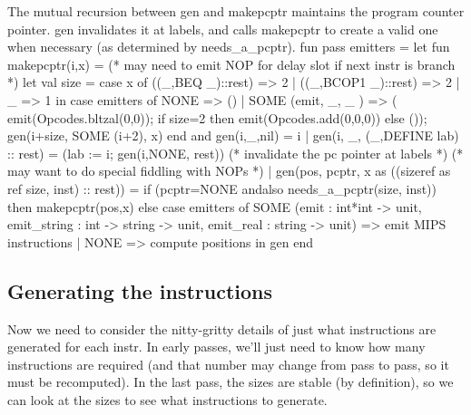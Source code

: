 The mutual recursion between \code{}gen\edoc{} and \code{}makepcptr\edoc{} maintains
the program counter pointer.
\code{}gen\edoc{} invalidates it at labels, and calls \code{}makepcptr\edoc{} to create a valid
one when necessary (as determined by \code{}needs_a_pcptr\edoc{}).
\enddocs
{}
\endmoddef
fun pass emitters =
let fun makepcptr(i,x) = 
         (* may need to emit NOP for delay slot if next instr is branch *)
  let val size = case x of ((_,BEQ _)::rest) => 2 
                         | ((_,BCOP1 _)::rest) => 2 
                         | _ => 1
  in  case emitters of NONE                     => () 
                     | SOME (emit, _, _ ) => (
                              emit(Opcodes.bltzal(0,0));
                              if size=2 then emit(Opcodes.add(0,0,0)) else ());
      gen(i+size, SOME (i+2), x)
  end
and gen(i,_,nil) = i
  | gen(i, _, (_,DEFINE lab) :: rest) = (lab := i; gen(i,NONE, rest))
                        (* invalidate the pc pointer at labels *)
  (* may want to do special fiddling with NOPs *)
  | gen(pos, pcptr, x as ((sizeref as ref size, inst) :: rest)) =
       if (pcptr=NONE andalso needs_a_pcptr(size, inst)) then makepcptr(pos,x)
       else case emitters of
          SOME (emit : int*int -> unit, emit_string : int -> string -> unit,
                emit_real : string -> unit) =>
             \LA{}emit MIPS instructions\RA{}
        | NONE =>
             \LA{}compute positions\RA{}
in  gen
end

\endcode
{}
\subsection{Generating the instructions}
Now we need to consider the nitty-gritty details of just what instructions
are generated for each \code{}instr\edoc{}.
In  early passes, we'll just need to know how many instructions are
required (and that number may change from pass to pass, so it must be
recomputed).
In the last pass, the sizes are stable (by definition), so we can look
at the sizes to see what instructions to generate.


